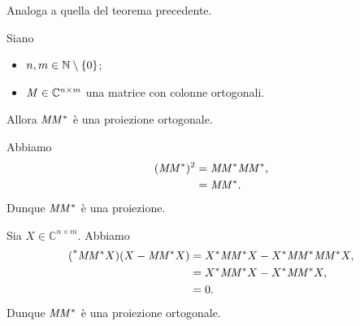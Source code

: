 \Proof Analoga a quella del teorema precedente. \EndProof
\begin{Theorem}
  Siano
  \begin{itemize}
    \item $n, m \in \mathbb{N} \setminus \lbrace 0 \rbrace$;
    \item $\mathit{M} \in \mathbb{C}^{n \times m}$ una matrice con colonne
      ortogonali.
  \end{itemize}
  Allora $\mathit{M}{\mathit{M}}^*$ \`e una proiezione ortogonale.
\end{Theorem}
\Proof Abbiamo
\begin{align*}
  (\mathit{M}{\mathit{M}}^*)^2
  &= \mathit{M}{\mathit{M}}^*\mathit{M}{\mathit{M}}^*,\\
  &= \mathit{M}{\mathit{M}}^*.
\end{align*}
Dunque $\mathit{M}{\mathit{M}}^*$ \`e una proiezione.
\par Sia $X \in \mathbb{C}^{n \times m}$. Abbiamo
\begin{align*}
  {(}^*\mathit{M}{\mathit{M}}^* X)
    (X - \mathit{M}{\mathit{M}}^* X)
  &= {X}^* \mathit{M}{\mathit{M}}^* X
    - {X}^* \mathit{M}{\mathit{M}}^*
      \mathit{M}{\mathit{M}}^* X,\\
  &= {X}^* \mathit{M}{\mathit{M}}^* X
    - {X}^* \mathit{M}{\mathit{M}}^*  X,\\
  &= 0.
\end{align*}
Dunque $\mathit{M}{\mathit{M}}^*$ \`e una proiezione ortogonale. \EndProof
